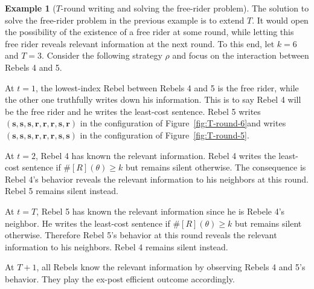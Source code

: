 \documentclass[12pt,letter]{article}
\newcommand\omicron{o}
\theoremstyle{definition}
\newtheorem{example}{Example}
\theoremstyle{remark}
\theoremstyle{claim}
\begin{document}
\begin{example}[$T$-round writing and solving the free-rider problem]
\label{ex:cost_function_talk_solve_fr}
The solution to solve the free-rider problem in the previous example is to extend $T$. It would open the possibility of the existence of a free rider at some round, while letting this free rider reveals relevant information at the next round. To this end, let $k=6$ and $T=3$. Consider the following strategy $\rho$ and focus on the interaction between Rebels 4 and 5.

At $t=1$, the lowest-index Rebel between Rebels 4 and 5 is the free rider, while the other one truthfully writes down his information. This is to say Rebel 4 will be the free rider and he writes the least-cost sentence. Rebel 5 writes $(\textbf{s},\textbf{s},\textbf{s},\textbf{r},\textbf{r},\textbf{r},\textbf{s},\textbf{r})$ in the configuration of Figure~\ref{fig:T-round-6}and writes $(\textbf{s},\textbf{s},\textbf{s},\textbf{r},\textbf{r},\textbf{r},\textbf{s},\textbf{s})$ in the configuration of Figure~\ref{fig:T-round-5}. 

At $t=2$, Rebel 4 has known the relevant information. Rebel 4 writes the least-cost sentence if $\#[R](\theta)\geq k$ but remains silent otherwise. The consequence is Rebel 4's behavior reveals the relevant information to his neighbors at this round. Rebel 5 remains silent instead. 

At $t=T$, Rebel 5 has known the relevant information since he is Rebele 4's neighbor. He writes the least-cost sentence if $\#[R](\theta)\geq k$ but remains silent otherwise. Therefore Rebel 5's behavior at this round reveals the relevant information to his neighbors. Rebel 4 remains silent instead.

At $T+1$, all Rebels know the relevant information by observing Rebels 4 and 5's behavior. They play the ex-post efficient outcome accordingly. 



\end{example}
\end{document}
